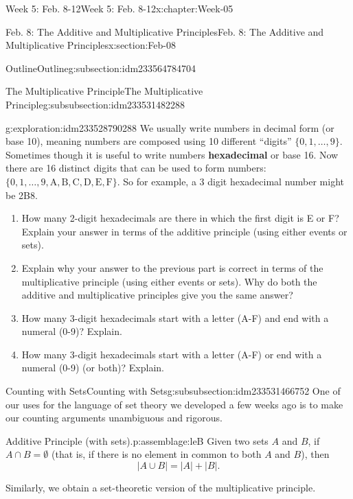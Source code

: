 \documentclass[oneside,10pt,]{book}
\newcommand{\terminology}[1]{\textbf{#1}}
\numberwithin{equation}{section}
\newcommand{\card}[1]{\left| #1 \right|}
\begin{document}
\begin{chapterptx}{Week 5: Feb. 8-12}{}{Week 5: Feb. 8-12}{}{}{x:chapter:Week-05}
\begin{sectionptx}{Feb. 8: The Additive and Multiplicative Principles}{}{Feb. 8: The Additive and Multiplicative Principles}{}{}{x:section:Feb-08}
\begin{subsectionptx}{Outline}{}{Outline}{}{}{g:subsection:idm233564784704}
\begin{subsubsectionptx}{The Multiplicative Principle}{}{The Multiplicative Principle}{}{}{g:subsubsection:idm233531482288}
\begin{exploration}{}{g:exploration:idm233528790288}%
We usually write numbers in decimal form (or base 10), meaning numbers are composed using 10 different ``digits'' \(\{0,1,\ldots, 9\}\). Sometimes though it is useful to write numbers \terminology{hexadecimal} or base 16. Now there are 16 distinct digits that can be used to form numbers: \(\{0, 1, \ldots, 9, \mathrm{A, B, C, D, E, F}\}\). So for example, a 3 digit hexadecimal number might be 2B8.%
\begin{enumerate}
\item{}How many 2-digit hexadecimals are there in which the first digit is E or F? Explain your answer in terms of the additive principle (using either events or sets).%
\par
%
\item{}Explain why your answer to the previous part is correct in terms of the multiplicative principle (using either events or sets). Why do both the additive and multiplicative principles give you the same answer?%
\item{}How many 3-digit hexadecimals start with a letter (A-F) and end with a numeral (0-9)? Explain.%
\par
%
\item{}How many 3-digit hexadecimals start with a letter (A-F) or end with a numeral (0-9) (or both)? Explain.%
\par
%
\end{enumerate}
%
\end{exploration}%
\end{subsubsectionptx}
%
%
\typeout{************************************************}
\typeout{************************************************}
%
\begin{subsubsectionptx}{Counting with Sets}{}{Counting with Sets}{}{}{g:subsubsection:idm233531466752}
One of our uses for the language of set theory we developed a few weeks ago is to make our counting arguments unambiguous and rigorous.%
\begin{assemblage}{Additive Principle (with sets).}{p:assemblage:leB}%
Given two sets \(A\) and \(B\), if \(A \cap B = \emptyset\) (that is, if there is no element in common to both \(A\) and \(B\)), then%
\begin{equation*}
\card{A \cup B} = \card{A} + \card{B}\text{.}
\end{equation*}
%
\end{assemblage}
Similarly, we obtain a set-theoretic version of the multiplicative principle.%

\end{subsubsectionptx}
\end{subsectionptx}
\end{sectionptx}
\end{chapterptx}
\end{document}
